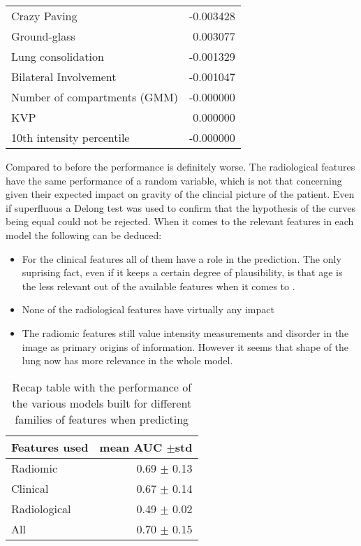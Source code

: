 \begin{table}
\begin{tabular}{lr}
		Crazy Paving                        &                     -0.003428 \\
		Ground-glass                        &                      0.003077 \\
		Lung consolidation                  &                     -0.001329 \\
		Bilateral Involvement               &                     -0.001047 \\
		Number of compartments (GMM)        &                     -0.000000 \\
		KVP                                 &                      0.000000 \\
		10th intensity percentile           &                     -0.000000 \\
		\bottomrule
		\end{tabular}
\end{table}

Compared to before the performance is definitely worse. 
The radiological features have the same performance of a random variable, which is not that concerning given their expected impact on gravity of the clincial picture of the patient.
Even if superfluous a Delong test was used to confirm that the hypothesis of the curves being equal could not be rejected. When it comes to the relevant features in each model the following can be deduced:

\begin{itemize}
\item For the clinical features all of them have a role in the prediction. The only suprising fact, even if it keeps a certain degree of plausibility, is that age is the less relevant out of the available features when it comes to \icu.
\item None of the radiological features have virtually any impact
\item The radiomic features still value intensity measurements and disorder in the image as primary origins of information. However it seems that shape of the lung now has more relevance in the whole model.
\end{itemize}

\begin{table}
\caption{Recap table with the performance of the various models built for different families of features when predicting \icu \label{tab:RecapICU}}
\centering
\begin{tabular}{l|r}
\toprule
Features used & mean AUC $\pm$std\\
\midrule
Radiomic  & 0.69 $\pm$ 0.13\\
Clinical  &  0.67 $\pm$ 0.14\\
Radiological & 0.49 $\pm$ 0.02\\
All & 0.70 $\pm$ 0.15 \\
\bottomrule
\end{tabular}
\end{table}

